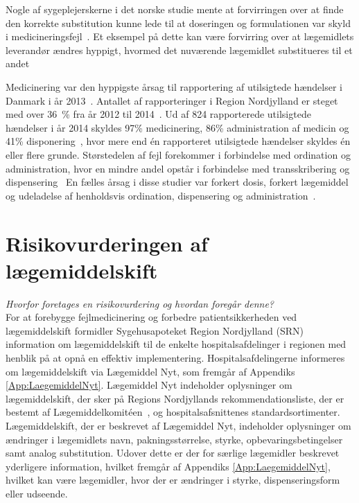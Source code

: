 Nogle af sygeplejerskerne i det norske studie mente at forvirringen over at finde den korrekte substitution kunne lede til at doseringen og formulationen var skyld i medicineringsfejl~\citep{Hakonsen2010}.%
Et eksempel på dette kan være forvirring over at lægemidlets leverandør ændres hyppigt, hvormed det nuværende lægemidlet substitueres til et andet~\citep{Wittich2014}

Medicinering var den hyppigste årsag til rapportering af utilsigtede hændelser i Danmark i år 2013~\citep{Patientombuddet2013}. Antallet af rapporteringer i Region Nordjylland er steget med over 36~\% fra år 2012 til 2014~\citep{Jensen2014}. Ud af 824 rapporterede utilsigtede hændelser i år 2014 skyldes 97\% medicinering, 86\% administration af medicin og 41\% disponering~\citep{Jensen2014}, hvor mere end én rapporteret utilsigtede hændelser skyldes én eller flere grunde.  %
Størstedelen af fejl forekommer i forbindelse med ordination og administration, hvor en mindre andel opstår i forbindelse med transskribering og dispensering~\citep{Agrawal2009, Anderson2002} En fælles årsag i disse studier var forkert dosis, forkert lægemiddel og udeladelse af henholdsvis ordination, dispensering og administration~\citep{Barker2002,Sundhedsstyrelsen2005,Lisby2005, Tully2009}.

\section{Risikovurderingen af lægemiddelskift} \label{sec:ImpLaeg}
\textit{Hvorfor foretages en risikovurdering og hvordan foregår denne?} \\
For at forebygge fejlmedicinering og forbedre patientsikkerheden ved lægemiddelskift formidler Sygehusapoteket Region Nordjylland (SRN) information om lægemiddelskift til de enkelte hospitalsafdelinger i regionen med henblik på at opnå en effektiv implementering. Hospitalsafdelingerne informeres om lægemiddelskift via Lægemiddel Nyt, som fremgår af Appendiks \ref{App:LaegemiddelNyt}. Lægemiddel Nyt indeholder oplysninger om lægemiddelskift, der sker på Regions Nordjyllands rekommendationsliste, der er bestemt af Lægemiddelkomitéen~\citep{RegionNordjylland2018}, og hospitalsafsnittenes standardsortimenter. Lægemiddelskift, der er beskrevet af Lægemiddel Nyt, indeholder oplysninger om ændringer i lægemidlets navn, pakningsstørrelse, styrke, opbevaringsbetingelser samt analog substitution. Udover dette er der for særlige lægemidler beskrevet yderligere information, hvilket fremgår af Appendiks \ref{App:LaegemiddelNyt}, hvilket kan være lægemidler, hvor der er ændringer i styrke, dispenseringsform eller udseende.

